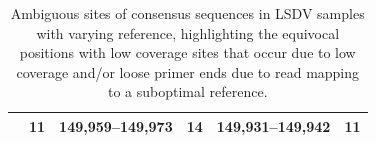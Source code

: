 \begin{table}[ht]
\begin{tabular}{l|llc|lc}
											& 11           & 149,959--149,973                                                                            & 14                                                                    & 149,931--149,942                                                                           & 11                                                                    \\ \hline
	\end{tabular}
	\caption[Ambiguous sites of consensus sequences in LSDV samples with varying reference.]{Ambiguous sites of consensus sequences in LSDV samples with varying reference, highlighting the equivocal positions with low coverage sites that occur due to low coverage and/or loose primer ends due to read mapping to a suboptimal reference.}
\label{tab:apx-capv-n}
\end{table}



